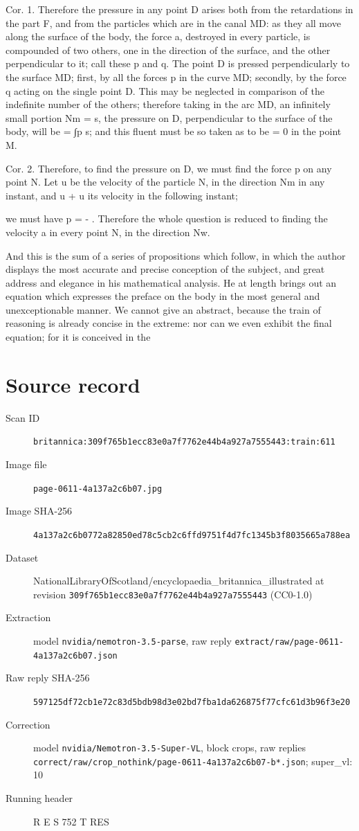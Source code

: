 \documentclass{article}
\begin{document}
Cor. 1. Therefore the pressure in any point D arises both from the retardations in the part F, and from the particles which are in the canal MD: as they all move along the surface of the body, the force a, destroyed in every particle, is compounded of two others, one in the direction of the surface, and the other perpendicular to it; call these p and q. The point D is pressed perpendicularly to the surface MD; first, by all the forces p in the curve MD; secondly, by the force q acting on the single point D. This may be neglected in comparison of the indefinite number of the others; therefore taking in the arc MD, an infinitely small portion Nm = s, the pressure on D, perpendicular to the surface of the body, will be = ∫p s; and this fluent must be so taken as to be = 0 in the point M.

Cor. 2. Therefore, to find the pressure on D, we must find the force p on any point N. Let u be the velocity of the particle N, in the direction Nm in any instant, and u + u its velocity in the following instant;

we must have p = - . Therefore the whole question is reduced to finding the velocity a in every point N, in the direction Nw.

And this is the sum of a series of propositions which follow, in which the author displays the most accurate and precise conception of the subject, and great address and elegance in his mathematical analysis. He at length brings out an equation which expresses the preface on the body in the most general and unexceptionable manner. We cannot give an abstract, because the train of reasoning is already concise in the extreme: nor can we even exhibit the final equation; for it is conceived in the


\section*{Source record}
\begin{description}
\item[Scan ID] \texttt{britannica:309f765b1ecc83e0a7f7762e44b4a927a7555443:train:611}
\item[Image file] \texttt{page-0611-4a137a2c6b07.jpg}
\item[Image SHA-256] \texttt{4a137a2c6b0772a82850ed78c5cb2c6ffd9751f4d7fc1345b3f8035665a788ea}
\item[Dataset] NationalLibraryOfScotland/encyclopaedia\_britannica\_illustrated at revision \texttt{309f765b1ecc83e0a7f7762e44b4a927a7555443} (CC0-1.0)
\item[Extraction] model \texttt{nvidia/nemotron-3.5-parse}, raw reply \texttt{extract/raw/page-0611-4a137a2c6b07.json}
\item[Raw reply SHA-256] \texttt{597125df72cb1e72c83d5bdb98d3e02bd7fba1da626875f77cfc61d3b96f3e20}
\item[Correction] model \texttt{nvidia/Nemotron-3.5-Super-VL}, block crops, raw replies \texttt{correct/raw/crop\_nothink/page-0611-4a137a2c6b07-b*.json}; super\_vl: 10
\item[Running header] R E S 752 T RES
\end{description}
\end{document}
